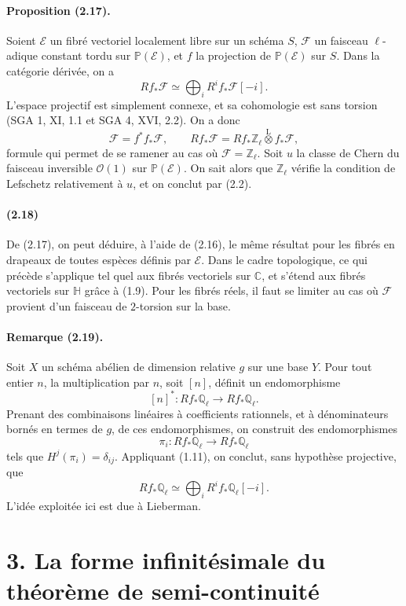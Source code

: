 \documentclass[10pt]{article}
\providecommand{\C}{\mathbb C}
\providecommand{\Ql}{\mathbb Q_\ell}
\providecommand{\Zl}{\mathbb Z_\ell}
\begin{document}
\paragraph{Proposition (2.17).} Soient $\mathcal E$ un fibré vectoriel localement libre sur un schéma $S$, $\mathcal F$ un faisceau $\ell$-adique constant tordu sur $\mathbb P(\mathcal E)$, et $f$ la projection de $\mathbb P(\mathcal E)$ sur $S$. Dans la catégorie dérivée, on a
\[
Rf_*\mathcal F\simeq\bigoplus_iR^if_*\mathcal F[-i].
\]
L'espace projectif est simplement connexe, et sa cohomologie est sans torsion (SGA 1, XI, 1.1 et SGA 4, XVI, 2.2). On a donc
\[
\mathcal F=f^*f_*\mathcal F,
\qquad
Rf_*\mathcal F=Rf_*\Zl\overset{\mathrm L}{\otimes} f_*\mathcal F,
\]
formule qui permet de se ramener au cas où $\mathcal F=\Zl$. Soit $u$ la classe de Chern du faisceau inversible $\mathcal O(1)$ sur $\mathbb P(\mathcal E)$. On sait alors que $\Zl$ vérifie la condition de Lefschetz relativement à $u$, et on conclut par (2.2).

\paragraph{(2.18)} De (2.17), on peut déduire, à l'aide de (2.16), le même résultat pour les fibrés en drapeaux de toutes espèces définis par $\mathcal E$. Dans le cadre topologique, ce qui précède s'applique tel quel aux fibrés vectoriels sur $\C$, et s'étend aux fibrés vectoriels sur $\mathbb H$ grâce à (1.9). Pour les fibrés réels, il faut se limiter au cas où $\mathcal F$ provient d'un faisceau de $2$-torsion sur la base.

\paragraph{Remarque (2.19).} Soit $X$ un schéma abélien de dimension relative $g$ sur une base $Y$. Pour tout entier $n$, la multiplication par $n$, soit $[n]$, définit un endomorphisme
\[
[n]^*:Rf_*\Ql\longrightarrow Rf_*\Ql.
\]
Prenant des combinaisons linéaires à coefficients rationnels, et à dénominateurs bornés en termes de $g$, de ces endomorphismes, on construit des endomorphismes
\[
\pi_i:Rf_*\Ql\longrightarrow Rf_*\Ql
\]
tels que $H^j(\pi_i)=\delta_{ij}$. Appliquant (1.11), on conclut, sans hypothèse projective, que
\[
Rf_*\Ql\simeq\bigoplus_iR^if_*\Ql[-i].
\]
L'idée exploitée ici est due à Lieberman.

\section*{3. La forme infinitésimale du théorème de semi-continuité}
\end{document}
